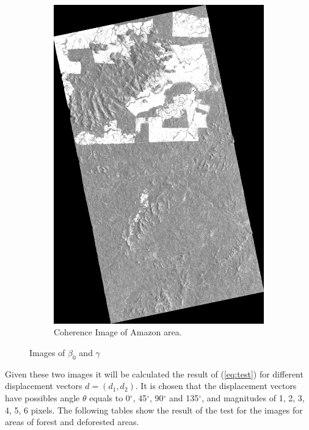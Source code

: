 \begin{figure}[H]
\begin{subfigure}[b]{0.4\linewidth}
      \includegraphics[width=0.8\linewidth]{Chapter4/coSSC_master_gamma_vol.png}
      \caption{Coherence Image of Amazon area.}
    \end{subfigure}
  \caption{Images of $\beta_0$ and $\gamma$}
  \label{fig:asdf}
\end{figure}

Given these two images it will be calculated the result of (\ref{eq:test}) for different displacement vectors
$d=(d_1, d_2)$. It is chosen that the displacement vectors have possibles angle $\theta$ equals to 0$^{\circ}$, 45$^{\circ}$, 90$^{\circ}$ and 135$^{\circ}$, and magnitudes of 1, 2, 3, 4, 5, 6 pixels.
The following tables show the result of the test for the images for areas of forest and deforested areas.



